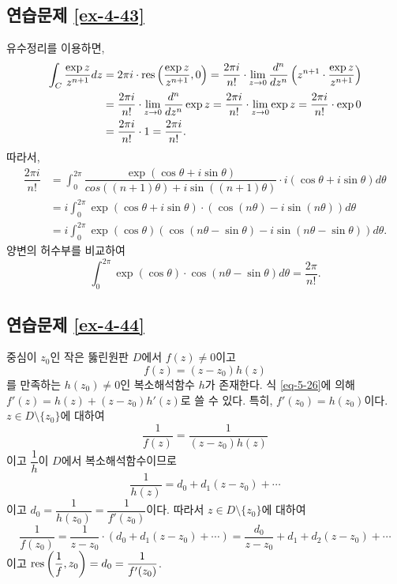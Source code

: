 \subsection*{연습문제 \ref{ex-4-43}}

유수정리를 이용하면,
\begin{align*}
\int_C \displaystyle\frac{\exp z}{z^{n+1}} dz
&= 2\pi i \cdot \mathop{\mathrm{res}}\left(\displaystyle\frac{\exp z}{z^{n+1}}, 0\right) 
= \displaystyle\frac{2\pi i}{n!} \cdot \lim_{z\to 0} \displaystyle\frac{d^n}{dz^n} 
\left(z^{n+1}\cdot \displaystyle\frac{\exp z}{z^{n+1}} \right) \\
&= \displaystyle\frac{2\pi i}{n!} \cdot \lim_{z\to 0} \displaystyle\frac{d^n}{dz^n} \exp z
= \displaystyle\frac{2\pi i}{n!} \cdot \lim_{z\to 0} \exp z 
= \displaystyle\frac{2\pi i}{n!} \cdot \exp 0 \\
&= \displaystyle\frac{2\pi i}{n!} \cdot 1 =  \displaystyle\frac{2\pi i}{n!}.
\end{align*}
따라서,
\begin{align*}
\dfrac{2\pi i}{n!}
&= \int_0^{2\pi} \dfrac{\exp(\cos\theta + i \sin\theta)}
{cos((n+1)\theta) + i\sin((n+1)\theta)} \cdot
i(\cos\theta + i\sin\theta) d\theta \\
&= i\int_0^{2\pi} \exp(\cos\theta + i\sin\theta)\cdot
\left(\cos(n\theta) - i\sin(n\theta) \right) d\theta \\
&=i\int_0^{2\pi} \exp(\cos\theta)\left(\cos(n\theta-\sin\theta)
- i \sin(n\theta - \sin\theta)\right)d\theta.
\end{align*}
양변의 허수부를 비교하여
\[
\int_0^{2\pi} \exp(\cos\theta)\cdot \cos(n\theta-\sin\theta) d\theta
= \dfrac{2\pi}{n!}.
\]
 
\subsection*{연습문제 \ref{ex-4-44}}

중심이 $z_0$인 작은 뚫린원판 $D$에서 $f(z)\ne0$이고
\begin{equation}\label{eq-5-26}
f(z) = (z-z_0)h(z)
\end{equation}
를 만족하는 $h(z_0)\ne0$인 복소해석함수 $h$가 존재한다.
식 \eqref{eq-5-26}에 의해
$f'(z) = h(z) + (z-z_0)h'(z)$로 쓸 수 있다.
특히, $f'(z_0) = h(z_0)$이다.
$z\in D\setminus \{z_0\}$에 대하여
\[
\dfrac1{f(z)} = \dfrac1{(z-z_0)h(z)}
\]
이고 $\dfrac1h$이 $D$에서 복소해석함수이므로
\[
\dfrac1{h(z)} = d_0 + d_1(z-z_0) + \cdots
\]
이고 $d_0 = \dfrac1{h(z_0)} = \dfrac1{f'(z_0)}$이다.
따라서 $z\in D\setminus\{z_0\}$에 대하여
\[
\dfrac1{f(z_0)} = \dfrac1{z-z_0} \cdot(d_0 + d_1(z-z_0) + \cdots)
= \dfrac{d_0}{z-z_0} + d_1 + d_2(z-z_0) + \cdots
\]
이고 $\mathop{\mathrm{res}}\left( \displaystyle\frac1f, z_0\right) = d_0 = \displaystyle\frac1{f'(z_0)}$.

